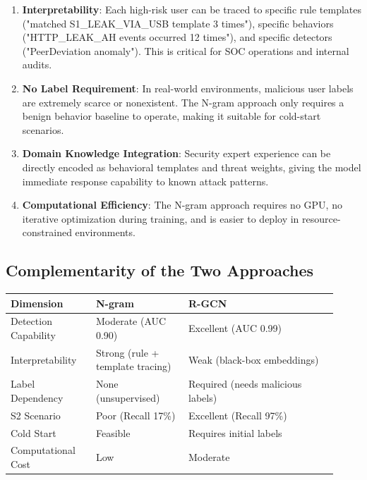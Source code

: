 \documentclass[
  a4paper,
  11pt]{article}
\newcounter{none} %
\begin{document}
\begin{enumerate}
\def\labelenumi{\arabic{enumi}.}
\item
  \textbf{Interpretability}: Each high-risk user can be traced to
  specific rule templates ("matched S1\_LEAK\_VIA\_USB template 3
  times"), specific behaviors ("HTTP\_LEAK\_AH events occurred 12
  times"), and specific detectors ("PeerDeviation anomaly"). This is
  critical for SOC operations and internal audits.
\item
  \textbf{No Label Requirement}: In real-world environments, malicious
  user labels are extremely scarce or nonexistent. The N-gram approach
  only requires a benign behavior baseline to operate, making it
  suitable for cold-start scenarios.
\item
  \textbf{Domain Knowledge Integration}: Security expert experience can
  be directly encoded as behavioral templates and threat weights, giving
  the model immediate response capability to known attack patterns.
\item
  \textbf{Computational Efficiency}: The N-gram approach requires no
  GPU, no iterative optimization during training, and is easier to
  deploy in resource-constrained environments.
\end{enumerate}

\subsection{Complementarity of the Two
Approaches}\label{complementarity-of-the-two-approaches}

{\def\LTcaptype{none} %
\begin{longtable}[]{@{}>{\raggedright\arraybackslash}p{0.24\linewidth}>{\raggedright\arraybackslash}p{0.26\linewidth}>{\raggedright\arraybackslash}p{0.42\linewidth}@{}}
\toprule\noalign{}
Dimension & N-gram & R-GCN \\
\midrule\noalign{}
\endhead
\bottomrule\noalign{}
\endlastfoot
Detection Capability & Moderate (AUC 0.90) & Excellent (AUC 0.99) \\
Interpretability & Strong (rule + template tracing) & Weak (black-box
embeddings) \\
Label Dependency & None (unsupervised) & Required (needs malicious
labels) \\
S2 Scenario & Poor (Recall 17\%) & Excellent (Recall 97\%) \\
Cold Start & Feasible & Requires initial labels \\
Computational Cost & Low & Moderate \\
\end{longtable}
}
\end{document}
